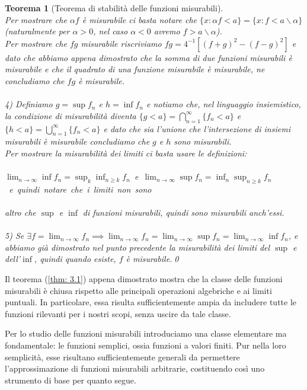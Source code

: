 \documentclass[a4paper,12pt]{report}
\newtheorem{teorema}{Teorema}[chapter]
\newcommand{\lt}{<}
\newcommand{\gt}{>}
\begin{document}
\begin{teorema}[Teorema di stabilità delle funzioni misurabili]
\\ Per mostrare che $\alpha f$ è misurabile ci basta notare che $\{x:\alpha f \lt a\}=\{x: f\lt a \backslash \alpha\}$ (naturalmente per $\alpha \gt 0$, nel caso $\alpha \lt 0$ avremo $f\gt a \backslash \alpha$).
\\Per mostrare che $fg$ misurabile riscriviamo $fg=4^{-1}[(f+g)^2-(f-g)^2]$ e dato che abbiamo appena dimostrato che la somma di due funzioni misurabili è misurabile e che il quadrato di una funzione misurabile è misurabile, ne concludiamo che $fg$ è misurabile.
\\
\\4) Definiamo $g=\sup f_n$ e $h=\inf f_n$ e notiamo che, nel linguaggio insiemistico, la condizione di misurabilità diventa $\{g \lt a\}=\displaystyle\bigcap_{n=1}^\infty\{f_n\lt a\}$ e $\{h \lt a\}=\displaystyle\bigcup_{n=1}^\infty\{f_n \lt a\}$ e dato che sia l'unione che l'intersezione di insiemi misurabili è misurabile concludiamo che $g$ e $h$ sono misurabili.
\\ Per mostrare la misurabilità dei limiti ci basta usare le definizioni:
\\
\\ \mbox{$\displaystyle\lim_{n\to\infty}\inf f_n=\sup_k\inf_{n \geq k}f_n$ e $\displaystyle\lim_{n\to\infty}\sup f_n=\inf_n\sup_{n\geq k}f_n$ e quindi notare che i limiti non sono }
\\
\\altro che $\sup$ e $\inf$ di funzioni misurabili, quindi sono misurabili anch'essi. 
\\
\\ 5) Se $\exists f=\displaystyle\lim_{n \to \infty} f_n\implies \lim_{n\to\infty}f_n=\lim_{n\to\infty}\sup f_n=\lim_{n\to\infty} \inf f_n$, e abbiamo già dimostrato nel punto precedente la misurabilità dei limiti del $\sup$ e dell'$\inf$, quindi quando esiste, $f$ è misurabile.\qed
\end{teorema}

Il teorema (\ref{thm: 3.1}) appena dimostrato mostra che la classe delle funzioni misurabili è chiusa rispetto alle principali operazioni algebriche e ai limiti puntuali. In particolare, essa risulta sufficientemente ampia da includere tutte le funzioni rilevanti per i nostri scopi, senza uscire da tale classe.

Per lo studio delle funzioni misurabili introduciamo una classe elementare ma fondamentale: le funzioni semplici, ossia funzioni a valori finiti. Pur nella loro semplicità, esse risultano sufficientemente generali da permettere l’approssimazione di funzioni misurabili arbitrarie, costituendo così uno strumento di base per quanto segue.
\end{document}
